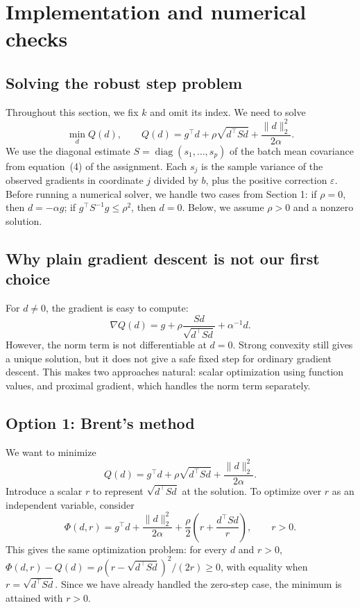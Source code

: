 \documentclass[11pt,a4paper]{article}
\begin{document}
\section{Implementation and numerical checks}

\subsection*{Solving the robust step problem}

Throughout this section, we fix $k$ and omit its index. We need to solve
\[
    \min_d Q(d),
    \qquad Q(d)=g^\top d+\rho\sqrt{d^\top Sd}
                       +\frac{\|d\|_2^2}{2\alpha}.
\]
We use the diagonal estimate $S=\operatorname{diag}(s_1,\ldots,s_p)$
of the batch mean covariance from equation~(4) of the assignment.
Each $s_j$ is the sample variance of the observed gradients in coordinate
$j$ divided by $b$, plus the positive correction $\varepsilon$.
Before running a numerical solver, we handle two cases from Section 1:
if $\rho=0$, then $d=-\alpha g$; if $g^\top S^{-1}g\leq\rho^2$,
then $d=0$. Below, we assume $\rho>0$ and a nonzero solution.

\subsection*{Why plain gradient descent is not our first choice}

For $d\neq 0$, the gradient is easy to compute:
\[
    \nabla Q(d)=g+\rho\frac{Sd}{\sqrt{d^\top Sd}}+\alpha^{-1}d.
\]
However, the norm term is not differentiable at $d=0$. Strong
convexity still gives a unique solution, but it does not give a safe
fixed step for ordinary gradient descent. This makes two approaches
natural: scalar optimization using function values, and proximal
gradient, which handles the norm term separately.

\subsection*{Option 1: Brent's method}

We want to minimize
\[
    Q(d)=g^\top d+\rho\sqrt{d^\top Sd}
                   +\frac{\|d\|_2^2}{2\alpha}.
\]
Introduce a scalar $r$ to represent $\sqrt{d^\top Sd}$ at the solution.
To optimize over $r$ as an independent variable, consider
\[
    \Phi(d,r)=g^\top d+\frac{\|d\|_2^2}{2\alpha}
              +\frac\rho2\left(r+\frac{d^\top Sd}{r}\right),
    \qquad r>0.
\]
This gives the same optimization problem: for every $d$ and $r>0$,
$\Phi(d,r)-Q(d)=\rho(r-\sqrt{d^\top Sd})^2/(2r)\geq0$, with equality
when $r=\sqrt{d^\top Sd}$. Since we have already handled the zero-step
case, the minimum is attained with $r>0$.
\end{document}
